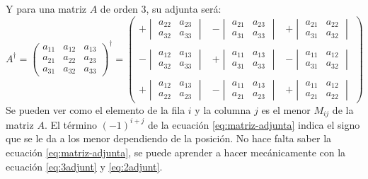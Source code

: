 \documentclass[arial,a4paper,print]{article}
\begin{document}
Y para una matriz $A$ de orden $3$, su adjunta será:
\begin{equation}
	A^{\dagger} = \begin{pmatrix}
		a_{11} & a_{12} & a_{13} \\
		a_{21} & a_{22} & a_{23} \\
		a_{31} & a_{32} & a_{33}
	\end{pmatrix}^{\dagger} = \begin{pmatrix}
	+\begin{vmatrix} a_{22} & a_{23} \\ a_{32} & a_{33} \end{vmatrix} &
	-\begin{vmatrix} a_{21} & a_{23} \\ a_{31} & a_{33} \end{vmatrix} &
	+\begin{vmatrix} a_{21} & a_{22} \\ a_{31} & a_{32} \end{vmatrix} \\
	\\
	-\begin{vmatrix} a_{12} & a_{13} \\ a_{32} & a_{33} \end{vmatrix} &
	+\begin{vmatrix} a_{11} & a_{13} \\ a_{31} & a_{33} \end{vmatrix} &
	-\begin{vmatrix} a_{11} & a_{12} \\ a_{31} & a_{32} \end{vmatrix} \\
	\\
	+\begin{vmatrix} a_{12} & a_{13} \\ a_{22} & a_{23} \end{vmatrix} &
	-\begin{vmatrix} a_{11} & a_{13} \\ a_{21} & a_{23} \end{vmatrix} &
	+\begin{vmatrix} a_{11} & a_{12} \\ a_{21} & a_{22} \end{vmatrix}
\end{pmatrix}
\label{eq:3adjunt}
\end{equation}
Se pueden ver como el elemento de la fila $i$ y la columna $j$ es el menor $M_{ij}$ de la matriz $A$. El término $(-1)^{i+j}$ de la ecuación \ref{eq:matriz-adjunta} indica el signo que se le da a los menor dependiendo de la posición. No hace falta saber la ecuación \ref{eq:matriz-adjunta}, se puede aprender a hacer mecánicamente con la ecuación \ref{eq:3adjunt} y \ref{eq:2adjunt}. 
\end{document}
